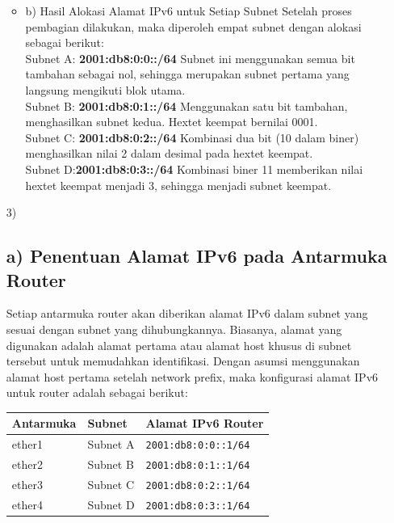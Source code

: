 \documentclass[12pt,a4paper]{article}
\begin{document}
\begin{itemize}
\begin{itemize}
\item b) Hasil Alokasi Alamat IPv6 untuk Setiap Subnet
Setelah proses pembagian dilakukan, maka diperoleh empat subnet dengan alokasi sebagai berikut:\\

Subnet A: \textbf{2001:db8:0:0::/64}
Subnet ini menggunakan semua bit tambahan sebagai nol, sehingga merupakan subnet pertama yang langsung mengikuti blok utama.\\

Subnet B: \textbf{2001:db8:0:1::/64}
Menggunakan satu bit tambahan, menghasilkan subnet kedua. Hextet keempat bernilai 0001.\\

Subnet C: \textbf{2001:db8:0:2::/64}
Kombinasi dua bit (10 dalam biner) menghasilkan nilai 2 dalam desimal pada hextet keempat.\\

Subnet D:\textbf{2001:db8:0:3::/64} 
Kombinasi biner 11 memberikan nilai hextet keempat menjadi 3, sehingga menjadi subnet keempat.

\end{itemize}

\item[3)] 
\subsection*{a) Penentuan Alamat IPv6 pada Antarmuka Router}
Setiap antarmuka router akan diberikan alamat IPv6 dalam subnet yang sesuai dengan subnet yang dihubungkannya. Biasanya, alamat yang digunakan adalah alamat pertama atau alamat host khusus di subnet tersebut untuk memudahkan identifikasi. Dengan asumsi menggunakan alamat host pertama setelah network prefix, maka konfigurasi alamat IPv6 untuk router adalah sebagai berikut:
\begin{center}
\begin{tabular}{|l|l|l|}
\hline
\textbf{Antarmuka} & \textbf{Subnet} & \textbf{Alamat IPv6 Router} \\
\hline
ether1 & Subnet A & \texttt{2001:db8:0:0::1/64} \\
\hline
ether2 & Subnet B & \texttt{2001:db8:0:1::1/64} \\
\hline
ether3 & Subnet C & \texttt{2001:db8:0:2::1/64} \\
\hline
ether4 & Subnet D & \texttt{2001:db8:0:3::1/64} \\
\hline
\end{tabular}
\end{center}


\end{itemize}
\end{document}
